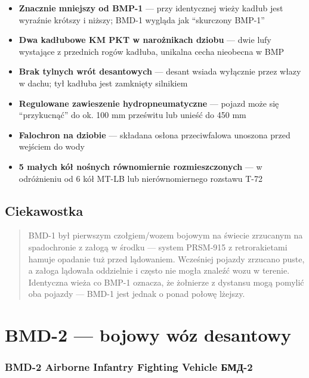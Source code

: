 \documentclass[12pt,oneside]{book}
\providecommand{\tightlist}{%
  \setlength{\itemsep}{0pt}\setlength{\parskip}{0pt}}
\begin{document}
\begin{itemize}
\tightlist
\item
  \textbf{Znacznie mniejszy od BMP-1} --- przy identycznej wieży kadłub
  jest wyraźnie krótszy i niższy; BMD-1 wygląda jak ``skurczony BMP-1''
\item
  \textbf{Dwa kadłubowe KM PKT w narożnikach dziobu} --- dwie lufy
  wystające z przednich rogów kadłuba, unikalna cecha nieobecna w BMP
\item
  \textbf{Brak tylnych wrót desantowych} --- desant wsiada wyłącznie
  przez włazy w dachu; tył kadłuba jest zamknięty silnikiem
\item
  \textbf{Regulowane zawieszenie hydropneumatyczne} --- pojazd może się
  ``przykucnąć'' do ok. 100 mm prześwitu lub unieść do 450 mm
\item
  \textbf{Falochron na dziobie} --- składana osłona przeciwfalowa
  unoszona przed wejściem do wody
\item
  \textbf{5 małych kół nośnych równomiernie rozmieszczonych} --- w
  odróżnieniu od 6 kół MT-LB lub nierównomiernego rozstawu T-72
\end{itemize}

\subsection{Ciekawostka}\label{ciekawostka-7}

\begin{quote}
BMD-1 był pierwszym czołgiem/wozem bojowym na świecie zrzucanym na
spadochronie z załogą w środku --- system PRSM-915 z retrorakietami
hamuje opadanie tuż przed lądowaniem. Wcześniej pojazdy zrzucano puste,
a załoga lądowała oddzielnie i często nie mogła znaleźć wozu w terenie.
Identyczna wieża co BMP-1 oznacza, że żołnierze z dystansu mogą pomylić
oba pojazdy --- BMD-1 jest jednak o ponad połowę lżejszy.
\end{quote}

\section{BMD-2 --- bojowy wóz
desantowy}\label{bmd-2-bojowy-wuxf3z-desantowy}

\subsubsection{BMD-2 Airborne Infantry Fighting Vehicle \textbar{}
БМД-2}\label{bmd-2-airborne-infantry-fighting-vehicle-ux431ux43cux434-2}
\end{document}
